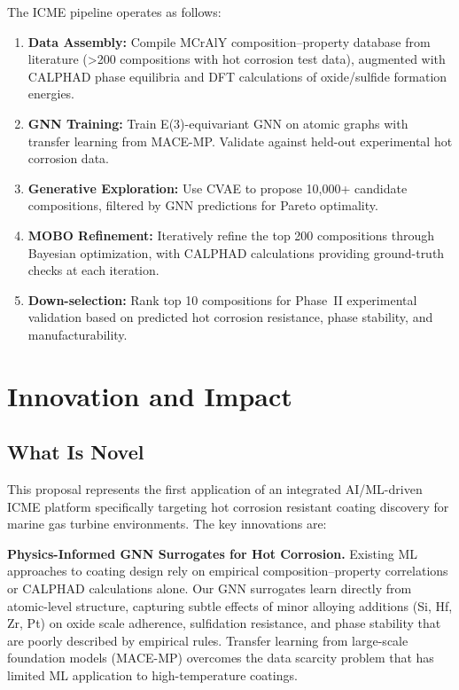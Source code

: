 \documentclass[11pt,letterpaper]{article}
\begin{document}
The ICME pipeline operates as follows:
\begin{enumerate}[nosep]
  \item \textbf{Data Assembly:} Compile MCrAlY composition--property database from literature (\textgreater200 compositions with hot corrosion test data), augmented with CALPHAD phase equilibria and DFT calculations of oxide/sulfide formation energies.
  \item \textbf{GNN Training:} Train E(3)-equivariant GNN on atomic graphs with transfer learning from MACE-MP. Validate against held-out experimental hot corrosion data.
  \item \textbf{Generative Exploration:} Use CVAE to propose 10,000+ candidate compositions, filtered by GNN predictions for Pareto optimality.
  \item \textbf{MOBO Refinement:} Iteratively refine the top 200 compositions through Bayesian optimization, with CALPHAD calculations providing ground-truth checks at each iteration.
  \item \textbf{Down-selection:} Rank top 10 compositions for Phase~II experimental validation based on predicted hot corrosion resistance, phase stability, and manufacturability.
\end{enumerate}


\section{Innovation and Impact}
\label{sec:innovation}

\subsection{What Is Novel}

This proposal represents the first application of an integrated AI/ML-driven ICME platform specifically targeting hot corrosion resistant coating discovery for marine gas turbine environments. The key innovations are:

\textbf{Physics-Informed GNN Surrogates for Hot Corrosion.} Existing ML approaches to coating design rely on empirical composition--property correlations or CALPHAD calculations alone. Our GNN surrogates learn directly from atomic-level structure, capturing subtle effects of minor alloying additions (Si, Hf, Zr, Pt) on oxide scale adherence, sulfidation resistance, and phase stability that are poorly described by empirical rules. Transfer learning from large-scale foundation models (MACE-MP) overcomes the data scarcity problem that has limited ML application to high-temperature coatings.
\end{document}

